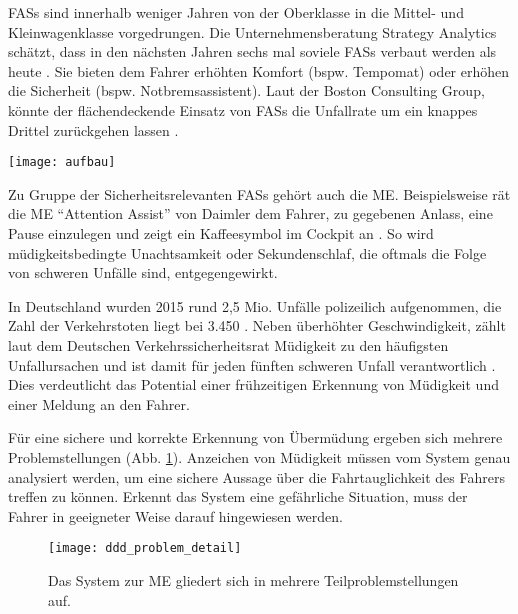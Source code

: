 \label{chap:intro}

\acl{FASs} sind innerhalb weniger Jahren von der Oberklasse in die Mittel- und Kleinwagenklasse vorgedrungen. Die Unternehmensberatung Strategy Analytics schätzt, dass in den nächsten Jahren sechs mal soviele \acl{FASs} verbaut werden als heute \cite{strategy_analytics}. Sie bieten dem Fahrer erhöhten Komfort (bspw. Tempomat) oder erhöhen die Sicherheit (bspw. Notbremsassistent). Laut der Boston Consulting Group, könnte der flächendeckende Einsatz von \acl{FASs} die Unfallrate um ein knappes Drittel zurückgehen lassen \cite{bcgperspectives}. 

\begin{figure*} 
  \begin{center}
    \texttt{[image: aufbau]}
    \caption[Skizze des Systemaufbaus]{Skizze des Systemaufbaus: \acl{BS} (Elektroenzephalografie / Elektrokardiogramm) liefert Daten an die Applikation und ein Feedback-Device warnt den müden Fahrer. Bild zeigt den Fahrsimulator der \acl{RTU}. \label{fig:sketch}}
  \end{center}
\end{figure*}

Zu Gruppe der Sicherheitsrelevanten \acl{FASs} gehört auch die \acl{ME}. Beispielsweise rät die \acl{ME} "`Attention Assist"' von Daimler dem Fahrer, zu gegebenen Anlass, eine Pause einzulegen und zeigt ein Kaffeesymbol im Cockpit an \cite{Daimler}. So wird müdigkeitsbedingte Unachtsamkeit oder Sekundenschlaf, die oftmals die Folge von schweren Unfälle sind, entgegengewirkt.

In Deutschland wurden 2015 rund 2,5 Mio. Unfälle polizeilich aufgenommen, die Zahl der Verkehrstoten liegt bei 3.450 \cite{accident_statistic}. Neben überhöhter Geschwindigkeit, zählt laut dem Deutschen Verkehrssicherheitsrat Müdigkeit zu den häufigsten Unfallursachen und ist damit für jeden fünften schweren Unfall verantwortlich \cite{dvr_statistic}. Dies verdeutlicht das Potential einer frühzeitigen Erkennung von Müdigkeit und einer Meldung an den Fahrer.

Für eine sichere und korrekte Erkennung von Übermüdung ergeben sich mehrere Problemstellungen (Abb. \ref{fig:ddd_problem}). Anzeichen von Müdigkeit müssen vom System genau analysiert werden, um eine sichere Aussage über die Fahrtauglichkeit des Fahrers treffen zu können. Erkennt das System eine gefährliche Situation, muss der Fahrer in geeigneter Weise darauf hingewiesen werden.

\begin{figure}[h] 
  \begin{center}
    \texttt{[image: ddd\_problem\_detail]}
    \caption[Problemstellung der Müdigkeitserkennung]{Das System zur \acl{ME} gliedert sich in mehrere Teilproblemstellungen auf.\label{fig:ddd_problem}}
  \end{center}
\end{figure}

